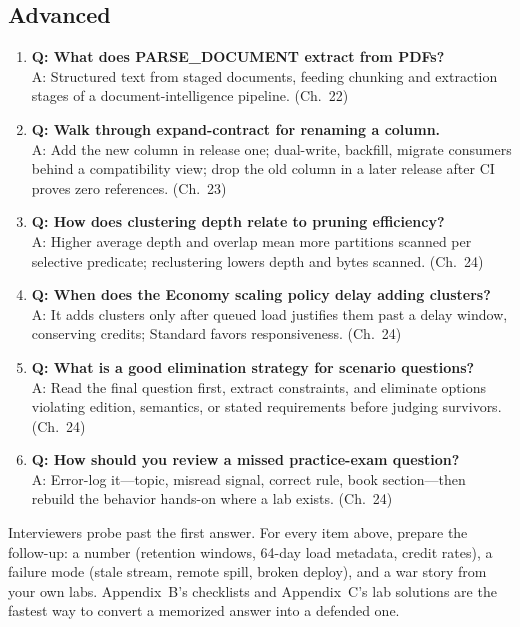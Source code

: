 \subsection{Advanced}
\begin{enumerate}
    \item \textbf{Q: What does PARSE\_DOCUMENT extract from PDFs?}\\
    A: Structured text from staged documents, feeding chunking and extraction stages of a document-intelligence pipeline. (Ch.~22)
    \item \textbf{Q: Walk through expand-contract for renaming a column.}\\
    A: Add the new column in release one; dual-write, backfill, migrate consumers behind a compatibility view; drop the old column in a later release after CI proves zero references. (Ch.~23)
    \item \textbf{Q: How does clustering depth relate to pruning efficiency?}\\
    A: Higher average depth and overlap mean more partitions scanned per selective predicate; reclustering lowers depth and bytes scanned. (Ch.~24)
    \item \textbf{Q: When does the Economy scaling policy delay adding clusters?}\\
    A: It adds clusters only after queued load justifies them past a delay window, conserving credits; Standard favors responsiveness. (Ch.~24)
    \item \textbf{Q: What is a good elimination strategy for scenario questions?}\\
    A: Read the final question first, extract constraints, and eliminate options violating edition, semantics, or stated requirements before judging survivors. (Ch.~24)
    \item \textbf{Q: How should you review a missed practice-exam question?}\\
    A: Error-log it---topic, misread signal, correct rule, book section---then rebuild the behavior hands-on where a lab exists. (Ch.~24)
\end{enumerate}

\begin{tipbox}
Interviewers probe past the first answer. For every item above, prepare the follow-up: a number
(retention windows, 64-day load metadata, credit rates), a failure mode (stale stream, remote
spill, broken deploy), and a war story from your own labs. Appendix~B's checklists and
Appendix~C's lab solutions are the fastest way to convert a memorized answer into a defended one.
\end{tipbox}
